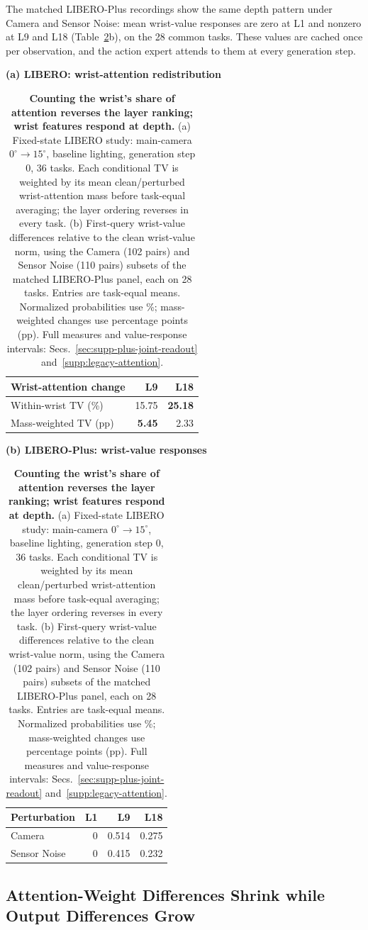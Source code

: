 The matched LIBERO-Plus recordings show the same depth pattern under Camera and Sensor Noise: mean wrist-value responses are zero at L1 and nonzero at L9 and L18 (Table~\ref{tab:attention-context}b), on the 28 common tasks. These values are cached once per observation, and the action expert attends to them at every generation step.

\begin{table}[t]
\centering\small
\setlength{\tabcolsep}{5pt}
\textbf{(a) LIBERO: wrist-attention redistribution}\\[2pt]
\begin{tabular}{@{}lrr@{}}
\toprule
Wrist-attention change & L9 & L18\\\midrule
Within-wrist TV (\%) & 15.75 & \textbf{25.18}\\
Mass-weighted TV (pp) & \textbf{5.45} & 2.33\\\bottomrule
\end{tabular}
\vspace{5pt}

\textbf{(b) LIBERO-Plus: wrist-value responses}\\[2pt]
\begin{tabular}{@{}lrrr@{}}
\toprule
Perturbation & L1 & L9 & L18\\\midrule
Camera & 0 & 0.514 & 0.275\\
Sensor Noise & 0 & 0.415 & 0.232\\\bottomrule
\end{tabular}
\caption{\textbf{Counting the wrist's share of attention reverses the layer ranking; wrist features respond at depth.} (a) Fixed-state LIBERO study: main-camera $0^\circ\!\rightarrow15^\circ$, baseline lighting, generation step 0, 36 tasks. Each conditional TV is weighted by its mean clean/perturbed wrist-attention mass before task-equal averaging; the layer ordering reverses in every task. (b) First-query wrist-value differences relative to the clean wrist-value norm, using the Camera (102 pairs) and Sensor Noise (110 pairs) subsets of the matched LIBERO-Plus panel, each on 28 tasks. Entries are task-equal means. Normalized probabilities use \%; mass-weighted changes use percentage points (pp). Full measures and value-response intervals: Secs.~\ref{sec:supp-plus-joint-readout} and~\ref{supp:legacy-attention}.}
\label{tab:attention-context}
\end{table}

\subsection{Attention-Weight Differences Shrink while Output Differences Grow}

